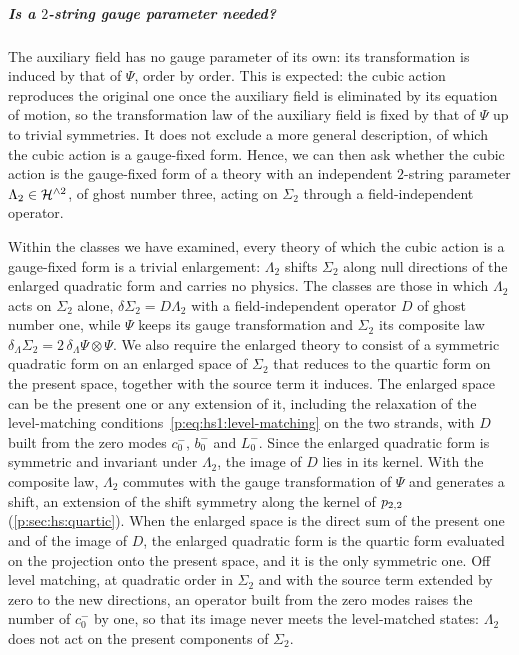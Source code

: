 \subparagraph{Is a $2$-string gauge parameter needed?}

The auxiliary field has no gauge parameter of its own: its transformation is induced by that of $\Psi$, order by order.
This is expected: the cubic action reproduces the original one once the auxiliary field is eliminated by its equation of motion, so the transformation law of the auxiliary field is fixed by that of $\Psi$ up to trivial symmetries.
  It does not exclude a more general description, of which the cubic action is a gauge-fixed form.
Hence, we can then ask whether the cubic action is the gauge-fixed form of a theory with an independent $2$-string parameter $\Lambda_2 \in \mathcal{H}^{\wedge 2}$, of ghost number three, acting on $\Sigma_2$ through a field-independent operator.

Within the classes we have examined, every theory of which the cubic action is a gauge-fixed form is a trivial enlargement: $\Lambda_2$ shifts $\Sigma_2$ along null directions of the enlarged quadratic form and carries no physics.
  The classes are those in which $\Lambda_2$ acts on $\Sigma_2$ alone, $\delta \Sigma_2 = D \Lambda_2$ with a field-independent operator $D$ of ghost number one, while $\Psi$ keeps its gauge transformation and $\Sigma_2$ its composite law $\delta_\Lambda \Sigma_2 = 2 \, \delta_\Lambda \Psi \otimes \Psi$.
  We also require the enlarged theory to consist of a symmetric quadratic form on an enlarged space of $\Sigma_2$ that reduces to the quartic form on the present space, together with the source term it induces.
  The enlarged space can be the present one or any extension of it, including the relaxation of the level-matching conditions~\eqref{p:eq:hs1:level-matching} on the two strands, with $D$ built from the zero modes $c_0^-$, $b_0^-$ and $L_0^-$.
  Since the enlarged quadratic form is symmetric and invariant under $\Lambda_2$, the image of $D$ lies in its kernel.
  With the composite law, $\Lambda_2$ commutes with the gauge transformation of $\Psi$ and generates a shift, an extension of the shift symmetry along the kernel of $p_{2,2}$ (\cref{p:sec:hs:quartic}).
  When the enlarged space is the direct sum of the present one and of the image of $D$, the enlarged quadratic form is the quartic form evaluated on the projection onto the present space, and it is the only symmetric one.
  Off level matching, at quadratic order in $\Sigma_2$ and with the source term extended by zero to the new directions, an operator built from the zero modes raises the number of $c_0^-$ by one, so that its image never meets the level-matched states: $\Lambda_2$ does not act on the present components of $\Sigma_2$.
